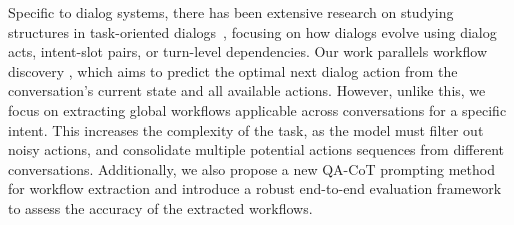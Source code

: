 Specific to dialog systems, there has been extensive research on studying structures in task-oriented dialogs~\cite{Jurafsky1997SwitchboardSS,Chotimongkol2008LearningTS,shi2019unsuperviseddialogstructurelearning,xu2020discoveringdialogstructuregraph,chen2021dsbertunsuperviseddialoguestructurelearning,Nath2021TSCAND,wang2021modellinghierarchicalstructuredialogue,rony2022dialokgknowledgestructureawaretaskoriented,lu2022unsupervisedlearninghierarchicalconversation,qiu2022structureextractiontaskorienteddialogues,Yin_2023,pryor2024usingdomainknowledgeguide,burdisso2024dialog2flow}, focusing on how dialogs evolve using dialog acts, intent-slot pairs, or turn-level dependencies. Our work parallels workflow discovery \cite{hattami2023workflow, raimondo2023improving,min2023workflowguided}, which aims to predict the optimal next dialog action from the conversation's current state and all available actions. However, unlike this, we focus on extracting global workflows applicable across conversations for a specific intent. This increases the complexity of the task, as the model must filter out noisy actions, and consolidate multiple potential actions sequences from different conversations. Additionally, we also propose a new QA-CoT prompting method for workflow extraction and introduce a robust  end-to-end evaluation framework to assess the accuracy of the extracted workflows.
 
%